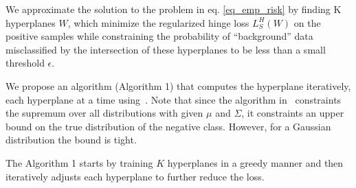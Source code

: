 \documentclass[twoside,11pt]{article}
\begin{document}
We approximate the solution to the problem in eq. \ref{eq_emp_risk} by finding K hyperplanes $W$, which minimize the regularized hinge loss $L_S^{H}(W)$ on the positive samples while constraining the probability of ``background'' data misclassified by the intersection of these hyperplanes to be less than a small threshold $\epsilon$.

We propose an algorithm (Algorithm 1) that computes the hyperplane iteratively, each hyperplane at a time using~\cite{OsadchyKR16}. Note that since the algorithm in~\cite{OsadchyKR16} constraints  the supremum over all distributions with given $\mu$ and $\Sigma$, it constraints an upper bound on the true distribution of the negative class. However, for a Gaussian distribution the bound is tight.

The Algorithm 1 starts by training $K$ hyperplanes in a greedy manner and then iteratively adjusts each hyperplane to further reduce the loss.
\end{document}
